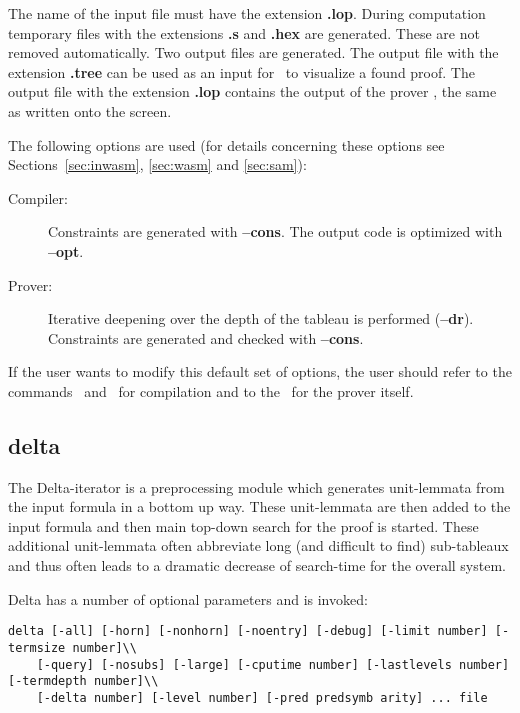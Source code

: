 The name of the input file must have the extension {\bf .lop}. During
computation temporary files with the extensions {\bf .s} and {\bf
.hex} are generated. These are not removed automatically. Two output
files are generated. The output file with the extension {\bf .tree}
can be used as an input for \xp\ to visualize a found
proof. The output file with the extension {\bf .lop} contains the
output of the prover \SAM, the same as written onto the screen.

The following options are used (for details concerning these options
see Sections~\ref{sec:inwasm}, \ref{sec:wasm} and \ref{sec:sam}): 
\begin{description}
      \item[Compiler:]
           {Constraints are generated  with {\bf --cons}.   The  output
            code is optimized with {\bf --opt}.}
      \item[Prover:]
           {Iterative deepening over the depth of  the  tableau  is
            performed   ({\bf --dr}).   Constraints  are  generated  and
            checked with {\bf --cons}.}
\end{description}

If the user wants to modify this default set of options, the
user  should  refer  to the commands \inw\ and \wasm\ for compilation
and to the \SAM\ for the prover itself.



\subsection{delta}
The {\sc Delta}-iterator is a preprocessing module which generates
unit-lemmata from the input formula in a bottom up way. These unit-lemmata
are then added to the input formula and then main top-down search for the
proof is started.
These additional unit-lemmata often abbreviate long (and difficult to find)
sub-tableaux and thus often leads to a dramatic decrease of search-time
for the overall system.

{\sc Delta} has a number of optional parameters and is invoked:

\begin{verbatim}
delta [-all] [-horn] [-nonhorn] [-noentry] [-debug] [-limit number] [-termsize number]\\
    [-query] [-nosubs] [-large] [-cputime number] [-lastlevels number] [-termdepth number]\\
    [-delta number] [-level number] [-pred predsymb arity] ... file
\end{verbatim}

